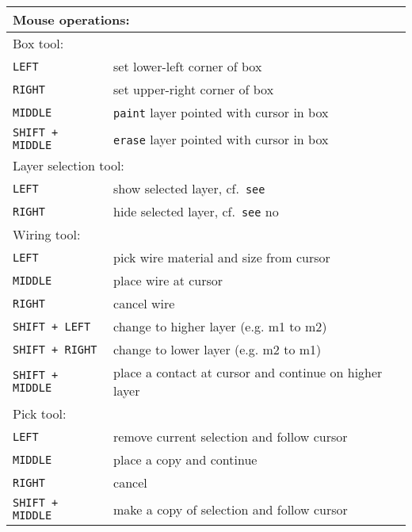 \documentclass[10pt,a4paper]{article}
\newcommand{\mac}[1]{\texttt{#1}}
\newcommand{\mouse}[1]{\texttt{#1}}
\begin{document}
	\begin{tabular}{p{}p{}}
		\toprule
		\multicolumn{2}{l}{Mouse operations:}\\
		\midrule
		\multicolumn{2}{l}{Box tool:}\\
		\mouse{LEFT} & set lower-left corner of box\\
		\mouse{RIGHT} & set upper-right corner of box\\
		\mouse{MIDDLE} & \mac{paint} layer pointed with cursor in box\\
		\mouse{SHIFT + MIDDLE} & \mac{erase} layer pointed with cursor in box\\
		\midrule
		\multicolumn{2}{l}{Layer selection tool:}\\
		\mouse{LEFT} & show selected layer, cf.~\mac{see}\\
		\mouse{RIGHT} & hide selected layer, cf.~\mac{see} no\\
		\midrule
		\multicolumn{2}{l}{Wiring tool:}\\
		\mouse{LEFT} & pick wire material and size from cursor\\
		\mouse{MIDDLE} & place wire at cursor\\
		\mouse{RIGHT} & cancel wire\\
		\mouse{SHIFT + LEFT} & change to higher layer (e.g. m1 to m2)\\
		\mouse{SHIFT + RIGHT} & change to lower layer (e.g. m2 to m1)\\
		\mouse{SHIFT + MIDDLE} & place a contact at cursor and continue on higher layer\\
		\midrule
		\multicolumn{2}{l}{Pick tool:}\\
		\mouse{LEFT} & remove current selection and follow cursor\\
		\mouse{MIDDLE} & place a copy and continue\\
		\mouse{RIGHT} & cancel\\
		\mouse{SHIFT + MIDDLE} & make a copy of selection and follow cursor\\
		\bottomrule
	\end{tabular}
	
\end{document}
